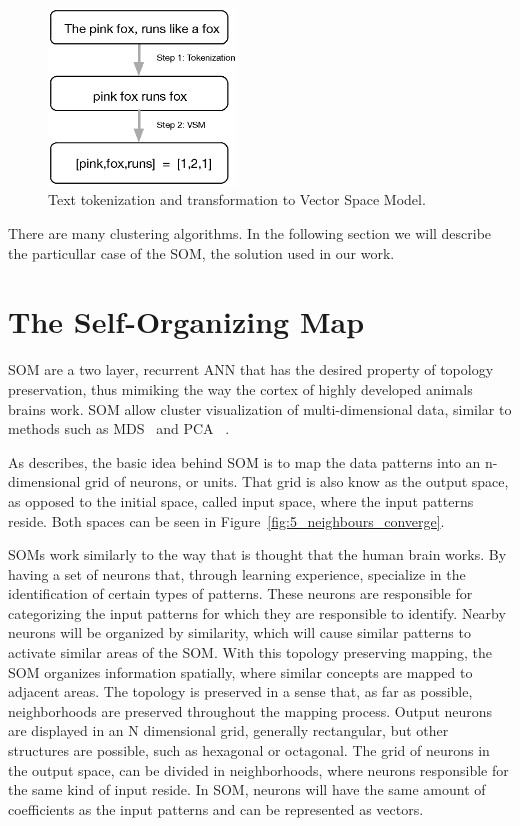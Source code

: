 \begin{figure}
  \begin{center}
    \includegraphics[width=5cm]{images/2_svm.eps}
  \end{center}
  \caption{ Text tokenization and transformation to Vector Space Model. }
  \label{fig:2_svm}
\end{figure}

There are many clustering algorithms. In the following section we will describe the particullar case of the \ac{SOM}, the solution used in our work.

\section{The Self-Organizing Map} 
\label{sec:the_self_organizing_map}

\ac{SOM} are a two layer, recurrent \ac{ANN} that has the desired property of topology preservation, thus mimiking the way the cortex of highly developed animals brains work. \ac{SOM} allow cluster visualization of multi-dimensional data, similar to methods such as \ac{MDS}~\cite{KruskalWish1978} and \ac{PCA}~\cite{Hotelling_1933} .  

As \citet{Bacao2005} describes, the basic idea behind SOM is to map the data patterns into an n-dimensional grid of neurons, or units. That grid is also know as the output space, as opposed to the initial space, called input space, where the input patterns reside. Both spaces can be seen in Figure~\ref{fig:5_neighbours_converge}.

SOMs work similarly to the way that is thought that the human brain works. By having a set of neurons that, through learning experience, specialize in the identification of certain types of patterns. These neurons are responsible for categorizing the input patterns for which they are responsible to identify. Nearby neurons will be organized by similarity, which will cause similar patterns to activate similar areas of the \ac{SOM}.
With this topology preserving mapping, the SOM organizes information spatially, where similar concepts are mapped to adjacent areas. The topology is preserved in a sense that, as far as possible, neighborhoods are preserved throughout the mapping process.
Output neurons are displayed in an N dimensional grid, generally rectangular, but other structures are possible, such as hexagonal or octagonal.  The grid of neurons in the output space, can be divided in neighborhoods, where neurons responsible for the same kind of input reside.
In SOM, neurons will have the same amount of coefficients as the input patterns and can be represented as vectors.

